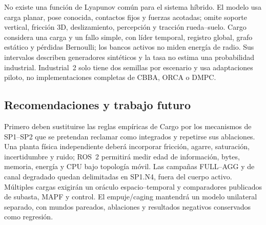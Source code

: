 No existe una función de Lyapunov común para el sistema híbrido. El modelo usa carga planar, pose conocida, contactos fijos y fuerzas acotadas; omite soporte vertical, fricción 3D, deslizamiento, percepción y tracción rueda--suelo. Cargo considera una carga y un fallo simple, con líder temporal, registro global, grafo estático y pérdidas Bernoulli; los bancos activos no miden energía de radio. Sus intervalos describen generadores sintéticos y la tasa \CargoEtwoESuccess{} no estima una probabilidad industrial. Industrial~2 solo tiene dos semillas por escenario y usa adaptaciones piloto, no implementaciones completas de CBBA, ORCA o DMPC.

\subsection{Recomendaciones y trabajo futuro}

Primero deben sustituirse las reglas empíricas de Cargo por los mecanismos de SP1--SP2 que se pretendan reclamar como integrados y repetirse sus ablaciones. Una planta física independiente deberá incorporar fricción, agarre, saturación, incertidumbre y ruido; ROS~2 permitirá medir edad de información, bytes, memoria, energía y CPU bajo topología móvil. Las campañas FULL--AGG y de canal degradado quedan delimitadas en SP1.N4, fuera del cuerpo activo. Múltiples cargas exigirán un oráculo espacio--temporal y comparadores publicados de subasta, MAPF y control. El empuje/caging mantendrá un modelo unilateral separado, con mundos pareados, ablaciones y resultados negativos conservados como regresión.
